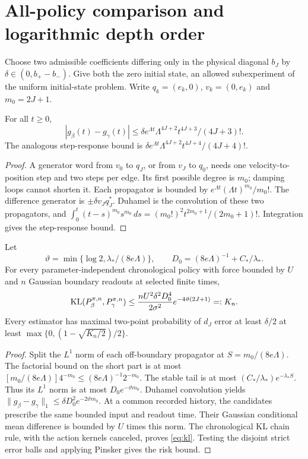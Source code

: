 \section{All-policy comparison and logarithmic depth order}
\label{sec:optimality}
Choose two admissible coefficients differing only in the physical diagonal
$b_J$ by $\delta\in(0,b_+-b_-)$. Give both the zero initial state, an allowed
subexperiment of the uniform initial-state problem. Write
$q_k=(e_k,0)$, $v_k=(0,e_k)$ and $m_0=2J+1$.

\begin{lemma}
\label{lem:two-way}
For all $t\ge0$,
\[
 |g_\beta(t)-g_\gamma(t)|\le
 \delta e^{\Lambda t}\Lambda^{4J+2}t^{4J+3}/(4J+3)!.
\]
The analogous step-response bound is
$\delta e^{\Lambda t}\Lambda^{4J+2}t^{4J+4}/(4J+4)!$.
\end{lemma}
\begin{proof}
A generator word from $v_0$ to $q_J$, or from $v_J$ to $q_0$, needs one
velocity-to-position step and two steps per edge. Its first possible degree
is $m_0$; damping loops cannot shorten it. Each propagator is bounded by
$e^{\Lambda t}(\Lambda t)^{m_0}/m_0!$. The difference generator is
$\pm\delta v_Jq_J^*$. Duhamel is the convolution of these two propagators,
and
$\int_0^t(t-s)^{m_0}s^{m_0}\,ds=(m_0!)^2t^{2m_0+1}/(2m_0+1)!$.
Integration gives the step-response bound.
\end{proof}

\begin{theorem}
\label{thm:global}
Let
\[
 \vartheta=\min\{\log2,\lambda_* /(8e\Lambda)\},\qquad
 D_0=(8e\Lambda)^{-1}+C_*/\lambda_*.
\]
For every parameter-independent chronological policy with force bounded by
$U$ and $n$ Gaussian boundary readouts at selected finite times,
\begin{equation}
 \operatorname{KL}(P_\beta^{\pi,n},P_\gamma^{\pi,n})
 \le\frac{nU^2\delta^2D_0^4}{2\sigma^2}
       e^{-4\vartheta(2J+1)}=:K_n.
 \label{eq:kl}
\end{equation}
Every estimator has maximal two-point probability of $d_J$ error at least
$\delta/2$ at least $\max\{0,(1-\sqrt{K_n/2})/2\}$.
\end{theorem}
\begin{proof}
Split the $L^1$ norm of each off-boundary propagator at
$S=m_0/(8e\Lambda)$. The factorial bound on the short part is at most
$[m_0/(8e\Lambda)]4^{-m_0}\le(8e\Lambda)^{-1}2^{-m_0}$.
The stable tail is at most $(C_*/\lambda_*)e^{-\lambda_*S}$.
Thus its $L^1$ norm is at most $D_0e^{-\vartheta m_0}$.
Duhamel convolution yields
$\|g_\beta-g_\gamma\|_1\le\delta D_0^2e^{-2\vartheta m_0}$.
At a common recorded history, the candidates prescribe the same bounded
input and readout time. Their Gaussian conditional mean difference is bounded
by $U$ times this norm. The chronological KL chain rule, with the action
kernels canceled, proves \eqref{eq:kl}. Testing the disjoint strict error
balls and applying Pinsker gives the risk bound.
\end{proof}

